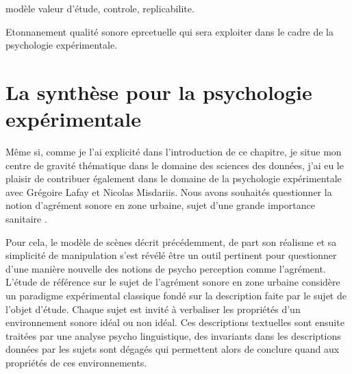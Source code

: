 modèle valeur d'étude, controle, replicabilite.

Etonnanement qualité sonore eprcetuelle qui sera exploiter dans le cadre de la psychologie expérimentale.

\section{La synthèse pour la psychologie expérimentale}

Même si, comme je l'ai explicité dans l'introduction de ce chapitre, je situe mon centre de gravité thématique dans le domaine des sciences des données, j'ai eu le plaisir de contribuer également dans le domaine de la psychologie expérimentale avec Grégoire Lafay et Nicolas Misdariis. Nous avons souhaités questionner la notion d'agrément sonore en zone urbaine, sujet d'une grande importance sanitaire \cite{europe}.

Pour cela, le modèle de scènes décrit précédemment, de part son réalisme et sa simplicité de manipulation s'est révélé être un outil pertinent pour questionner d'une manière nouvelle des notions de psycho perception comme l'agrément. L'étude de référence sur le sujet de l'agrément sonore en zone urbaine \cite{guastavino} considère un paradigme expérimental classique fondé sur la description faite par le sujet de l'objet d'étude. Chaque sujet est invité à verbaliser les propriétés d'un environnement sonore idéal ou non idéal. Ces descriptions textuelles sont ensuite traitées par une analyse psycho linguistique, des invariants dans les descriptions données par les sujets sont dégagés qui permettent alors de conclure quand aux propriétés de ces environnements.

